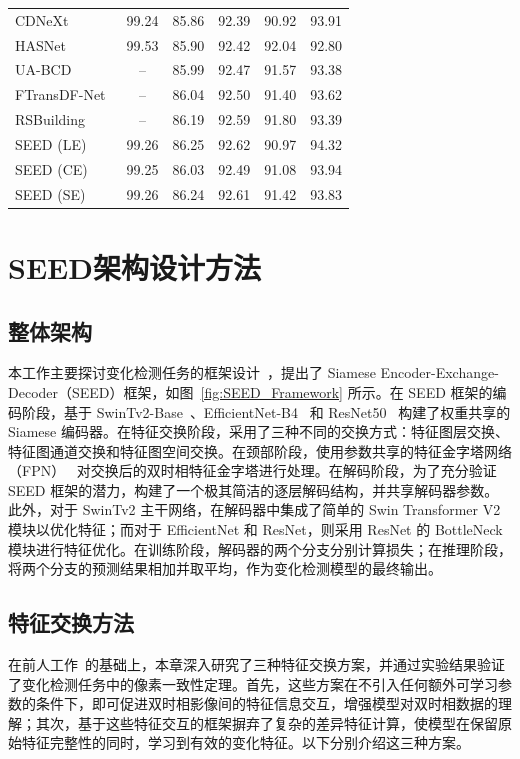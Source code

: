 \begin{table}[!htbp]
\begin{tabular}{lccccc}
CDNeXt~\cite{wei_robust_2024}              & 99.24 & 85.86 & 92.39 & 90.92 & 93.91 \\
HASNet~\cite{c_tao_hasnet_2025}            & 99.53 & 85.90 & 92.42 & 92.04 & 92.80 \\
UA-BCD~\cite{li_overcoming_2025}           & --    & 85.99 & 92.47 & 91.57 & 93.38 \\
FTransDF-Net~\cite{li_dual_2025}           & --    & 86.04 & 92.50 & 91.40 & 93.62 \\
RSBuilding~\cite{wang_rsbuilding_2024}     & --    & 86.19 & 92.59 & 91.80 & 93.39 \\
\hline
SEED (LE)                                      & 99.26 & 86.25 & 92.62 & 90.97 & 94.32 \\
SEED (CE) & 99.25	& 86.03	& 92.49	& 91.08	& 93.94 \\
SEED (SE) & 99.26	& 86.24	& 92.61	& 91.42	& 93.83 \\
\hline
\end{tabular}
\end{table}

\section{SEED架构设计方法}
\subsection{整体架构}  
本工作主要探讨变化检测任务的框架设计~\cite{dong_efficientcd_2024, Fang2022ChangerFI, zhao_exchanging_2023}，提出了 Siamese Encoder-Exchange-Decoder（SEED）框架，如图~\ref{fig:SEED_Framework} 所示。在 SEED 框架的编码阶段，基于 SwinTv2-Base~\cite{liu_swin_2021-5}、EfficientNet-B4~\cite{tan_efficientnet_2019} 和 ResNet50~\cite{He2015DeepRL} 构建了权重共享的 Siamese 编码器。在特征交换阶段，采用了三种不同的交换方式：特征图层交换、特征图通道交换和特征图空间交换。在颈部阶段，使用参数共享的特征金字塔网络（FPN）~\cite{lin_feature_2017} 对交换后的双时相特征金字塔进行处理。在解码阶段，为了充分验证 SEED 框架的潜力，构建了一个极其简洁的逐层解码结构，并共享解码器参数。此外，对于 SwinTv2 主干网络，在解码器中集成了简单的 Swin Transformer V2 模块以优化特征；而对于 EfficientNet 和 ResNet，则采用 ResNet 的 BottleNeck 模块进行特征优化。在训练阶段，解码器的两个分支分别计算损失；在推理阶段，将两个分支的预测结果相加并取平均，作为变化检测模型的最终输出。

\subsection{特征交换方法}  
在前人工作~\cite{dong_efficientcd_2024, Fang2022ChangerFI, zhao_exchanging_2023}的基础上，本章深入研究了三种特征交换方案，并通过实验结果验证了变化检测任务中的像素一致性定理。首先，这些方案在不引入任何额外可学习参数的条件下，即可促进双时相影像间的特征信息交互，增强模型对双时相数据的理解；其次，基于这些特征交互的框架摒弃了复杂的差异特征计算，使模型在保留原始特征完整性的同时，学习到有效的变化特征。以下分别介绍这三种方案。

